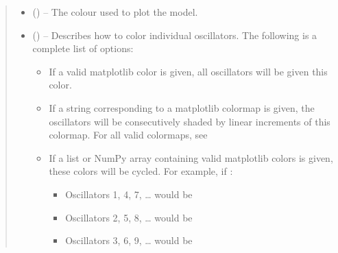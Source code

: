 \documentclass[letterpaper,10pt,english]{sphinxmanual}
\begin{document}
\begin{fulllineitems}
\begin{quote}
\begin{description}
\begin{itemize}
\item {} 
\sphinxAtStartPar
{} (\sphinxstyleliteralemphasis{\sphinxupquote{, }}) – The colour used to plot the model.

\item {} 
\sphinxAtStartPar
{} (\sphinxstyleliteralemphasis{\sphinxupquote{, }}\sphinxstyleliteralemphasis{\sphinxupquote{,     }}\sphinxstyleliteralemphasis{\sphinxupquote{, }}\sphinxstyleliteralemphasis{\sphinxupquote{, }}\sphinxstyleliteralemphasis{\sphinxupquote{, }}) – 
\sphinxAtStartPar
Describes how to color individual oscillators. The following
is a complete list of options:
\begin{itemize}
\item {} 
\sphinxAtStartPar
If a valid matplotlib color is given, all oscillators will
be given this color.

\item {} 
\sphinxAtStartPar
If a string corresponding to a matplotlib colormap is given,
the oscillators will be consecutively shaded by linear increments
of this colormap. For all valid colormaps, see

\item {} 
\sphinxAtStartPar
If a list or NumPy array containing valid matplotlib colors is
given, these colors will be cycled.
For example, if :
\begin{itemize}
\item {} 
\sphinxAtStartPar
Oscillators 1, 4, 7, … would be 

\item {} 
\sphinxAtStartPar
Oscillators 2, 5, 8, … would be 

\item {} 
\sphinxAtStartPar
Oscillators 3, 6, 9, … would be 


\end{itemize}
\end{itemize}
\end{itemize}
\end{description}
\end{quote}
\end{fulllineitems}
\end{document}
